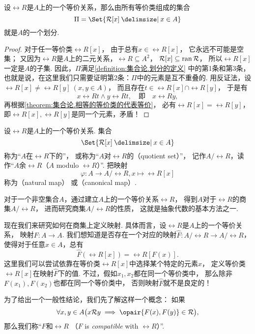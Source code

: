 \begin{theorem}
设\(\rel{R}\)是\(A\)上的一个等价关系，那么由所有等价类组成的集合\[
	\Pi = \Set{ \rel{R}[x] \given x \in A }
\]就是\(A\)的一个划分.
\begin{proof}
对于任一等价类\(\rel{R}[x]\)，
由于总有\(x \in \rel{R}[x]\)，
它永远不可能是空集；
又因为\(\rel{R}\)是\(A\)上的二元关系，\(\rel{R} \subseteq A^2\)，
\(\mathcal{R}[x] \subseteq \operatorname{ran} \mathcal{R}\)，
所以\(\rel{R}[x]\)一定是\(A\)的子集.
因此，\(\Pi\)满足\cref{definition:集合论.划分的定义} 中的第1条和第3条，
也就是说，在这里我们只需要证明第2条：\(\Pi\)中的元素是互不重叠的.
用反证法，设\(\rel{R}[x] \neq \rel{R}[y]\ (x,y \in A)\)，
而且存在\(t \in \rel{R}[x] \cap \rel{R}[y]\)，
于是有\[
	x \rel{R} t \land y \rel{R} t,
	\quad\text{即}\quad
	x \rel{R} y,
\]
再根据\cref{theorem:集合论.相等的等价类的代表等价}，
必有\(\rel{R}[x] = \rel{R}[y]\)，
即\(\rel{R}[x],\rel{R}[y]\)是同一个元素，矛盾！
\end{proof}
\end{theorem}

\begin{definition}
设\(\rel{R}\)是\(A\)上的一个等价关系.
集合\[
	\Set{ \rel{R}[x] \given x \in A }
\]称为“\(A\)在\(\rel{R}\)下的”，
或称为“\(A\)对\(\rel{R}\)的（quotient set）”，
记作\(A/\rel{R}\)，读作“\(A\)余\(\rel{R}\)（\(A\) modulo \(\rel{R}\)）”.
把映射\[
	\varphi\colon A \to A/\rel{R}, x \mapsto \rel{R}[x]
\]称为（natural map）%
或（canonical map）.
\end{definition}
对于一个非空集合\(A\)，通过建立\(A\)上的一个等价关系\(\rel{R}\)，
得到\(A\)对于\(\rel{R}\)的商集\(A/\rel{R}\)，
进而研究商集\(A/\rel{R}\)的性质，
这就是抽象代数的基本方法之一.

现在我们来研究如何在商集上定义映射.
具体而言，设\(\rel{R}\)是\(A\)上的一个等价关系，
映射\(F\colon A \to A\).
我们想知道是否存在一个对应的映射\(\hat{F}\colon A/\rel{R} \to A/\rel{R}\)，
使得对于任意\(x \in A\)，总有\[
	\hat{F}(\rel{R}[x]) = \rel{R}[F(x)].
\]
这里我们可以尝试依靠在等价类\(\rel{R}[x]\)中选择某个特定的元素\(x\)，
定义等价类\(\rel{R}[x]\)在映射\(\hat{F}\)下的值.
不过，假如\(x_1,x_2\)都在同一个等价类中，
那么除非\(F(x_1),F(x_2)\)也都在同一个等价类中，
否则映射\(\hat{F}\)就不是良定的！

为了给出一个一般性结论，我们先了解这样一个概念：
如果\[
	\forall x,y \in A \bigl(
		x \rel{R} y
		\implies
		\opair{F(x),F(y)} \in \rel{R}
	\bigr),
\]
那么我们称“\(F\)和\(\rel{R}\)%
（\(F\) is \emph{compatible} with \(\rel{R}\)）”.

